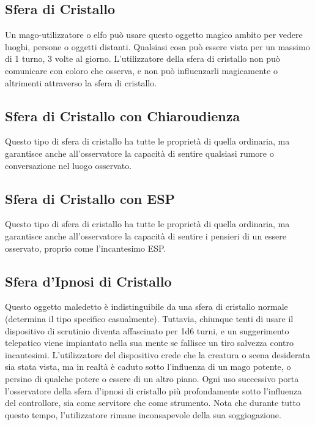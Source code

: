 \documentclass{article}
\begin{document}
\begin{multicols}{2}
\begin{table}[h]
\end{table}

\subsection{Sfera di Cristallo}
Un mago-utilizzatore o elfo può usare questo oggetto magico ambito per vedere luoghi, persone o oggetti distanti. Qualsiasi cosa può essere vista per un massimo di 1 turno, 3 volte al giorno. L'utilizzatore della sfera di cristallo non può comunicare con coloro che osserva, e non può influenzarli magicamente o altrimenti attraverso la sfera di cristallo.

\subsection{Sfera di Cristallo con Chiaroudienza}
Questo tipo di sfera di cristallo ha tutte le proprietà di quella ordinaria, ma garantisce anche all'osservatore la capacità di sentire qualsiasi rumore o conversazione nel luogo osservato.

\subsection{Sfera di Cristallo con ESP}
Questo tipo di sfera di cristallo ha tutte le proprietà di quella ordinaria, ma garantisce anche all'osservatore la capacità di sentire i pensieri di un essere osservato, proprio come l'incantesimo ESP.

\subsection{Sfera d'Ipnosi di Cristallo}
Questo oggetto maledetto è indistinguibile da una sfera di cristallo normale (determina il tipo specifico casualmente). Tuttavia, chiunque tenti di usare il dispositivo di scrutinio diventa affascinato per 1d6 turni, e un suggerimento telepatico viene impiantato nella sua mente se fallisce un tiro salvezza contro incantesimi. L'utilizzatore del dispositivo crede che la creatura o scena desiderata sia stata vista, ma in realtà è caduto sotto l'influenza di un mago potente, o persino di qualche potere o essere di un altro piano. Ogni uso successivo porta l'osservatore della sfera d'ipnosi di cristallo più profondamente sotto l'influenza del controllore, sia come servitore che come strumento. Nota che durante tutto questo tempo, l'utilizzatore rimane inconsapevole della sua soggiogazione.


\end{multicols}
\end{document}
